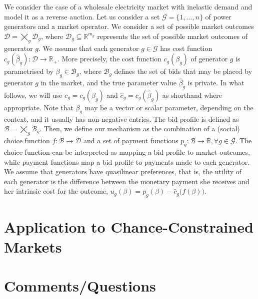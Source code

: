 \documentclass{article}
\begin{document}
We consider the case of a wholesale electricity market with inelastic demand and model it as a reverse auction. Let us consider a set $\mathcal{G} = \{1, \ldots, n\}$ of power generators and a market operator. We consider a set of possible market outcomes $\mathcal{D} = \bigtimes_g \mathcal{D}_g$, where $\mathcal{D}_g \subseteq \mathbb{R}^{m_g}$ represents the set of possible market outcomes of generator $g$. We assume that each generator $g \in \mathcal{G}$ has cost function $c_g(\hat{\beta}_g): \mathcal{D} \rightarrow \mathbb{R}_+$. More precisely, the cost function $c_g(\beta_g)$ of generator $g$ is parametrised by $\beta_g \in \mathcal{B}_g$, where $\mathcal{B}_g$ defines the set of bids that may be placed by generator $g$ in the market, and the true parameter value $\hat{\beta}_g$ is private. In what follows, we will use $c_g = c_g(\beta_g)$ and $\hat{c}_g = c_g(\hat{\beta}_g)$ as shorthand where appropriate. Note that $\beta_g$ may be a vector or scalar parameter, depending on the context, and it usually has non-negative entries. The bid profile is defined as $\mathcal{B} = \bigtimes_g \mathcal{B}_g$. Then, we define our mechanism as the combination of a (social) choice function $f: \mathcal{B} \rightarrow \mathcal{D}$ and a set of payment functions $p_g: \mathcal{B} \rightarrow \mathbb{R}, \forall g \in \mathcal{G}$. The choice function can be interpreted as mapping a bid profile to market outcomes, while payment functions map a bid profile to payments made to each generator. We assume that generators have quasilinear preferences, that is, the utility of each generator is the difference between the monetary payment she receives and her intrinsic cost for the outcome, $u_g(\beta) = p_g(\beta) - \hat{c}_g\big(f(\beta)\big)$.

\section{Application to Chance-Constrained Markets}

\section{Comments/Questions}
\end{document}
